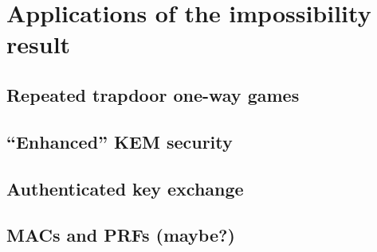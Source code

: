 
\section{Applications of the impossibility result}

\subsection{Repeated trapdoor one-way games}

\subsection{``Enhanced'' KEM security}

\subsection{Authenticated key exchange}

\subsection{MACs and PRFs (maybe?)}


